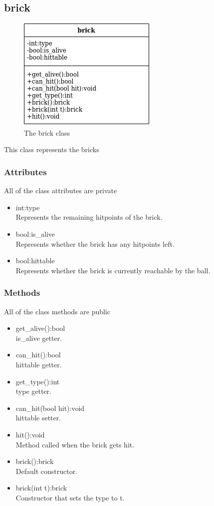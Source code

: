 \documentclass[]{article}
\begin{document}
\subsection{brick}
\begin{figure}[h!]
    \centering
    \includegraphics[scale=0.5]{brick.jpg}
    \caption{The brick class}
    \label{fig:brick class diagram }
\end{figure}
This class represents the bricks
\subsubsection{Attributes}
All of the class attributes are private
\begin{itemize}
	\item int:type\\Represents the remaining hitpoints of the brick.
	\item bool:is\_alive\\Represents whether the brick has any hitpoints left.
	\item bool:hittable\\Represents whether the brick is currently reachable by the ball. 
\end{itemize}
\subsubsection{Methods}
All of the class methods are public
\begin{itemize}
	\item get\_alive():bool\\ is\_alive getter.
	\item can\_hit():bool\\hittable getter.
	\item get\_type():int\\ type getter.
	\item can\_hit(bool hit):void\\hittable setter.
	\item hit():void\\ Method called when the brick gets hit.
	\item brick():brick\\Default constructor.
	\item brick(int t):brick\\Constructor that sets the type to t.
\end{itemize}
\end{document}
